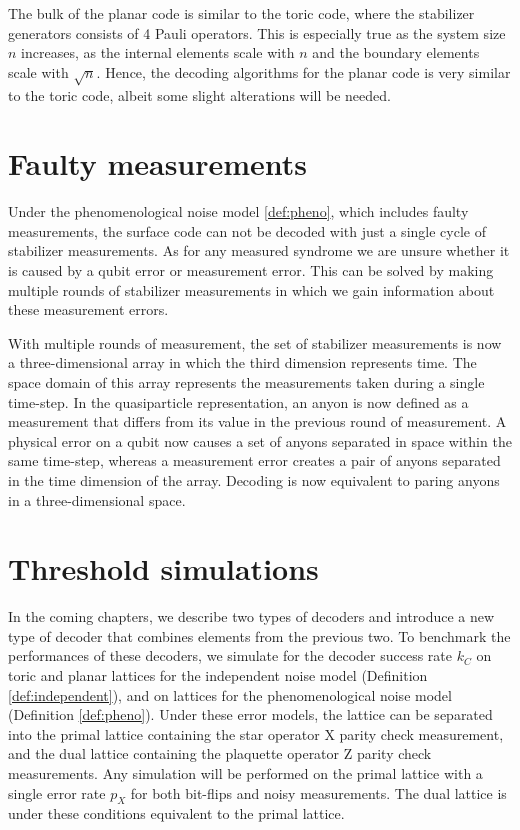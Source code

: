 \vspace{1em}
The bulk of the planar code is similar to the toric code, where the stabilizer generators consists of 4 Pauli operators. This is especially true as the system size $n$ increases, as the internal elements scale with $n$ and the boundary elements scale with $\sqrt{n}$. Hence, the decoding algorithms for the planar code is very similar to the toric code, albeit some slight alterations will be needed. 

\section{Faulty measurements}\label{sec:faultymeasurments}

Under the phenomenological noise model \ref{def:pheno}, which includes faulty measurements, the surface code can not be decoded with just a single cycle of stabilizer measurements. As for any measured syndrome we are unsure whether it is caused by a qubit error or measurement error. This can be solved by making multiple rounds of stabilizer measurements in which we gain information about these measurement errors. 

With multiple rounds of measurement, the set of stabilizer measurements is now a three-dimensional array in which the third dimension represents time. The space domain of this array represents the measurements taken during a single time-step. In the quasiparticle representation, an anyon is now defined as a measurement that differs from its value in the previous round of measurement. A physical error on a qubit now causes a set of anyons separated in space within the same time-step, whereas a measurement error creates a pair of anyons separated in the time dimension of the array. Decoding is now equivalent to paring anyons in a three-dimensional space. 

\section{Threshold simulations}\label{sec:simthres}

In the coming chapters, we describe two types of decoders and introduce a new type of decoder that combines elements from the previous two. To benchmark the performances of these decoders, we simulate for the decoder success rate $k_C$ on toric and planar lattices for the independent noise model (Definition \ref{def:independent}), and on lattices for the phenomenological noise model (Definition \ref{def:pheno}). Under these error models, the lattice can be separated into the primal lattice containing the star operator X parity check measurement, and the dual lattice containing the plaquette operator Z parity check measurements. Any simulation will be performed on the primal lattice with a single error rate $p_X$ for both bit-flips and noisy measurements. The dual lattice is under these conditions equivalent to the primal lattice. 


